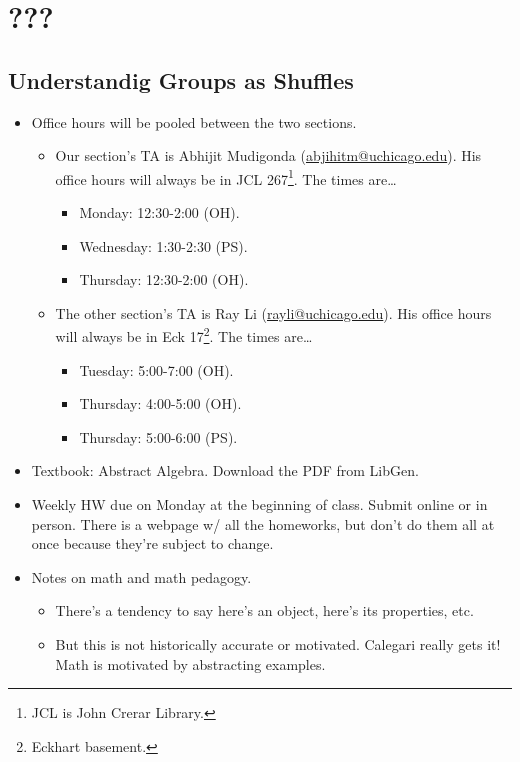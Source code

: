 \documentclass[../notes.tex]{subfiles}
\begin{document}
\chapter{???}
\section{Understandig Groups as Shuffles}
\begin{itemize}
    \item {}Office hours will be pooled between the two sections.
    \begin{itemize}
        \item Our section's TA is Abhijit Mudigonda (\href{mailto:abjihitm@uchicago.edu}{abjihitm@uchicago.edu}). His office hours will always be in JCL 267\footnote{JCL is John Crerar Library.}. The times are\dots
        \begin{itemize}
            \item Monday: 12:30-2:00 (OH).
            \item Wednesday: 1:30-2:30 (PS).
            \item Thursday: 12:30-2:00 (OH).
        \end{itemize}
        \item The other section's TA is Ray Li (\href{mailto:rayli@uchicago.edu}{rayli@uchicago.edu}). His office hours will always be in Eck 17\footnote{Eckhart basement.}. The times are\dots
        \begin{itemize}
            \item Tuesday: 5:00-7:00 (OH).
            \item Thursday: 4:00-5:00 (OH).
            \item Thursday: 5:00-6:00 (PS).
        \end{itemize}
    \end{itemize}
    \item Textbook: Abstract Algebra. Download the PDF from LibGen.
    \item Weekly HW due on Monday at the beginning of class. Submit online or in person. There is a webpage w/ all the homeworks, but don't do them all at once because they're subject to change.
    \item Notes on math and math pedagogy.
    \begin{itemize}
        \item There's a tendency to say here's an object, here's its properties, etc.
        \item But this is not historically accurate or motivated. Calegari really gets it! Math is motivated by abstracting examples.

\end{itemize}
\end{itemize}
\end{document}
